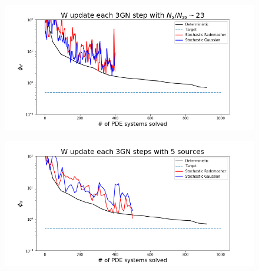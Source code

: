 \documentclass[twoside]{article}
\begin{document}
\begin{figure}[!ht]
\begin{minipage}{.49\textwidth}
  \centering
  \includegraphics[width=.99\linewidth]{figures/W_update_each_3GN_step_with_1_source.png}
  \label{1S3GN}
\end{minipage}
\begin{minipage}{.49\textwidth}
  \centering
  \includegraphics[width=.99\linewidth]{figures/W_update_each_3GN_steps_with_5_sources.png}
  \label{5S3GN}
\end{minipage}

\end{figure}
\end{document}

